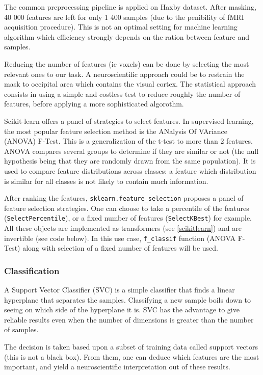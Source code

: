 \documentclass{frontiersSCNS} %
\begin{document}
The common preprocessing pipeline is applied on Haxby dataset. After masking, 40
000 features are left for only 1 400 samples (due to the penibility of fMRI
acquisition procedure). This is not an optimal setting for machine learning
algorithm which efficiency strongly depends on the ration between feature and
samples.

Reducing the number of features (ie voxels) can be done by selecting the most
relevant ones to our task. A neuroscientific approach could be to restrain the
mask to occipital area which contains the visual cortex. The statistical
approach consists in using a simple and costless test to reduce roughly the
number of features, before applying a more sophisticated algorothm.

Scikit-learn offers a panel of strategies to select features. In supervised
learning, the most popular feature selection method is the
ANalysis Of VAriance (ANOVA) F-Test. This is a generalization of the t-test to
more than 2 features.
ANOVA compares several groups to determine if they are similar or not (the null
hypothesis being that they are randomly drawn from the same population).
It is used to compare feature distributions across classes: a feature which
distribution is similar for all classes is not likely to contain much
information.

After ranking the features, \verb!sklearn.feature_selection! proposes a panel
of feature selection strategies. One can choose to take a percentile of the features
(\verb!SelectPercentile!), or a fixed number of features (\verb!SelectKBest!)
for example. All these objects are implemented as transformers (see
\ref{scikitlearn}) and are invertible (see code below).
In this use case, \verb!f_classif! function (ANOVA F-Test) along with selection
of a fixed number of features will be used.

\subsubsection{Classification}

A Support Vector Classifier (SVC) is a simple classifier that finds a linear
hyperplane that separates the samples. Classifying a new sample boils down to
seeing on which side of the hyperplane it is. SVC has the advantage to
give reliable results even when the number of dimensions is greater than the
number of samples.

The decision is taken based upon a subset of training data called
support vectors (this is not a black box). From them, one can deduce which
features are the most important, and yield a neuroscientific interpretation out
of these results.
\end{document}
